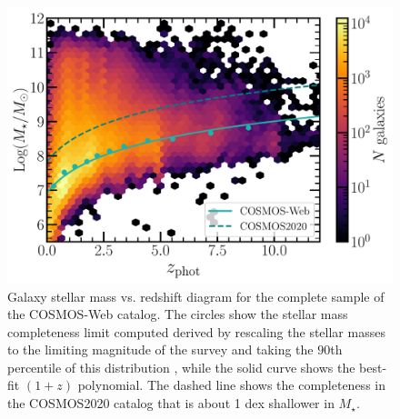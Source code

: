 \documentclass[longauth]{aa}
\begin{document}
\begin{figure}[t!]
\includegraphics[width=1\columnwidth]{figures/photo-z_stellar-mass.pdf}
\caption{Galaxy stellar mass vs. redshift diagram for the complete sample of the COSMOS-Web catalog. The circles show the stellar mass completeness limit computed derived by rescaling the stellar masses to the limiting magnitude of the survey and taking the $90$th percentile of this distribution \citep[following][]{pozzetti_zcosmos_2010}, while the solid curve shows the best-fit $(1+z)$ polynomial. The dashed line shows the completeness in the COSMOS2020 catalog that is about 1 dex shallower in $M_{\star}$.}
\label{fig:photoz-smass}
\end{figure}
\end{document}
